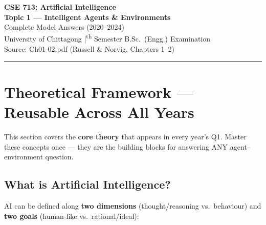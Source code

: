 \documentclass[12pt, a4paper]{article}
\begin{document}

\begin{center}
  {\LARGE\bfseries\color{sectionblue} CSE 713: Artificial Intelligence}\\[0.6em]
  {\Large\bfseries Topic 1 — Intelligent Agents \& Environments}\\[0.3em]
  {\large Complete Model Answers (2020–2024)}\\[0.2em]
  {\normalsize University of Chittagong \quad|\textsuperscript{th} Semester B.Sc.\ (Engg.) Examination}\\[0.3em]
  {\small Source: Ch01-02.pdf (Russell \& Norvig, Chapters 1--2)}
\end{center}

\vspace{0.3em}
\noindent\rule{\linewidth}{1pt}
\vspace{0.5em}

\tableofcontents
\newpage

\section{Theoretical Framework — Reusable Across All Years}

This section covers the \textbf{core theory} that appears in every year's Q1. Master these concepts once — they are the building blocks for answering ANY agent–environment question.

\subsection{What is Artificial Intelligence?}

\noindent AI can be defined along \textbf{two dimensions} (thought/reasoning vs.\ behaviour) and \textbf{two goals} (human-like vs.\ rational/ideal):
\end{document}
